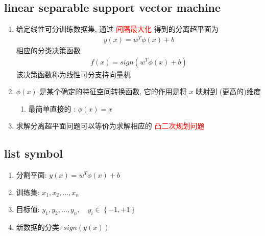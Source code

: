 \documentclass[oneside, 12pt]{ctexbook}
\begin{document}
			\subsection{\quad linear separable support vector machine}
				\begin{enumerate}
					\item 给定线性可分训练数据集, 通过 \textcolor{red}{间隔最大化} 得到的分离超平面为
						\begin{align}
							y(x) = w^T \phi(x) + b
						\end{align}
						相应的分类决策函数 
						\begin{align}
							f(x) = sign(w^T \phi(x) + b)
						\end{align}
						该决策函数称为线性可分支持向量机
						
					\item $\phi(x)$ 是某个确定的特征空间转换函数, 它的作用是将 $x$ 映射到 (更高的)维度
						\begin{enumerate}
							\item 最简单直接的 : $\phi(x) = x$
						\end{enumerate}
					
					\item 求解分离超平面问题可以等价为求解相应的 \textcolor{red}{凸二次规划问题}
				\end{enumerate}
	
			\subsection{\quad list symbol}
				\begin{enumerate}
					\item 分割平面: $y(x) = w^T \phi(x) + b$
		
					\item 训练集: $x_1, x_2, ..., x_n$
					
					\item 目标值: $y_1, y_2, ..., y_n, \quad y_i \in \left\{ -1, +1 \right\}$
					
					\item 新数据的分类: $sign(y(x))$
				\end{enumerate}
			
\end{document}
